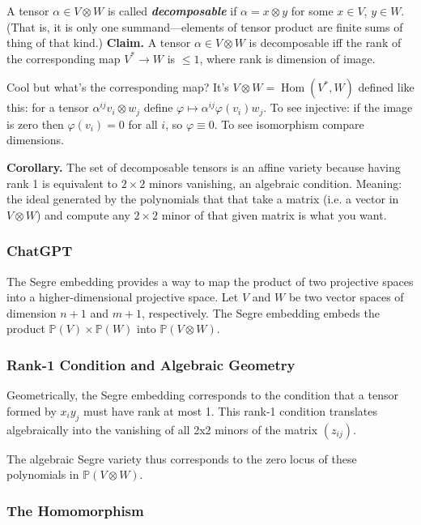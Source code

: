 A tensor \(\alpha \in V \otimes W\) is called \textit{\textbf{decomposable}} if  \(\alpha=x \otimes y \) for some \(x \in V\), \(y \in W\). (That is, it is only one summand---elements of tensor product are finite sums of thing of that kind.) \textbf{Claim.} A tensor \(\alpha \in V \otimes W\) is decomposable iff the rank of the corresponding map \(V^* \to W\) is \(\leq 1\), where rank is dimension of image.

Cool but what's the corresponding map? It's \(V \otimes W =\operatorname{Hom}(V^*,W)\) defined like this: for a tensor \(\alpha^{ij}v_i \otimes w_j\) define \(\varphi \mapsto \alpha^{ij}\varphi(v_i)w_j\). To see injective: if the image is zero then \(\varphi(v_i)=0\) for all \(i\), so \(\varphi\equiv 0\). To see isomorphism compare dimensions.

\textbf{Corollary.} The set of decomposable tensors is an affine variety because having rank 1 is equivalent to \(2 \times 2\) minors vanishing, an algebraic condition. Meaning: the ideal generated by the polynomials that that take a matrix (i.e. a vector in \(V \otimes W\)) and compute any \(2\times 2\) minor of that given matrix is what you want.

\subsubsection{ChatGPT}
The Segre embedding provides a way to map the product of two projective spaces into a higher-dimensional projective space. Let \( V \) and \( W \) be two vector spaces of dimension \( n+1 \) and \( m+1 \), respectively. The Segre embedding embeds the product \( \mathbb{P}(V) \times \mathbb{P}(W) \) into \( \mathbb{P}(V \otimes W) \).


\subsubsection*{Rank-1 Condition and Algebraic Geometry}

Geometrically, the Segre embedding corresponds to the condition that a tensor formed by \( x_i y_j \) must have rank at most 1. This rank-1 condition translates algebraically into the vanishing of all 2x2 minors of the matrix \( (z_{ij}) \).

The algebraic Segre variety thus corresponds to the zero locus of these polynomials in \( \mathbb{P}(V \otimes W) \).


\subsubsection*{The Homomorphism}

